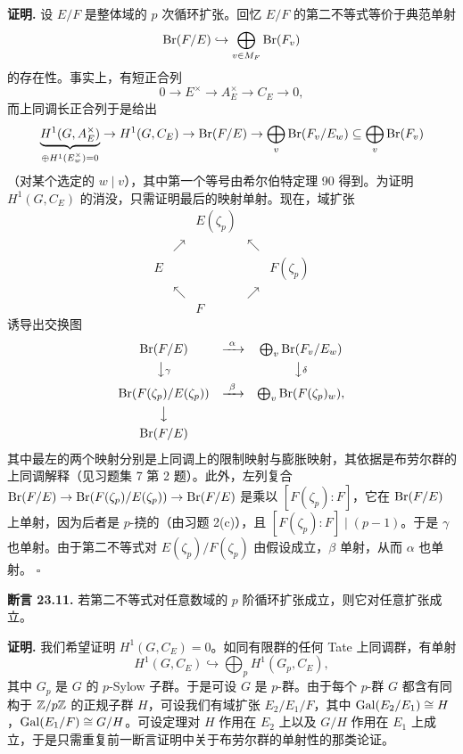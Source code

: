\textbf{证明.} 设 $E/F$ 是整体域的 $p$ 次循环扩张。回忆 $E/F$ 的第二不等式等价于典范单射
\[
\operatorname{Br}(F/E)\hookrightarrow\bigoplus_{v\in M_F}\operatorname{Br}(F_v)
\]
的存在性。事实上，有短正合列
\[
0\to E^\times\to A_E^\times\to C_E\to 0,
\]
而上同调长正合列于是给出
\[
\underbrace{H^1(G,A_E^\times)}_{\oplus H^1(E_w^\times)=0}\to H^1(G,C_E)\to\operatorname{Br}(F/E)\to\bigoplus_v\operatorname{Br}(F_v/E_w)\subseteq\bigoplus_v\operatorname{Br}(F_v)
\]
（对某个选定的 $w\mid v$），其中第一个等号由希尔伯特定理 90 得到。为证明 $H^1(G,C_E)$ 的消没，只需证明最后的映射单射。现在，域扩张
\[
\begin{array}{ccccc}
& & E(\zeta_p) & &\\
& \nearrow & & \nwarrow &\\
E & & & & F(\zeta_p)\\
& \nwarrow & & \nearrow &\\
& & F & &
\end{array}
\]
诱导出交换图
\[
\begin{array}{ccc}
\operatorname{Br}(F/E) & \xrightarrow{\ \alpha\ } & \bigoplus_v\operatorname{Br}(F_v/E_w)\\[4pt]
\big\downarrow{\scriptstyle\gamma} & & \big\downarrow{\scriptstyle\delta}\\[4pt]
\operatorname{Br}(F(\zeta_p)/E(\zeta_p)) & \xrightarrow{\ \beta\ } & \bigoplus_v\operatorname{Br}(F(\zeta_p)_w),\\[4pt]
\big\downarrow & & \\[4pt]
\operatorname{Br}(F/E) & &
\end{array}
\]
其中最左的两个映射分别是上同调上的限制映射与膨胀映射，其依据是布劳尔群的上同调解释（见习题集 7 第 2 题）。此外，左列复合 $\operatorname{Br}(F/E)\to\operatorname{Br}(F(\zeta_p)/E(\zeta_p))\to\operatorname{Br}(F/E)$ 是乘以 $[F(\zeta_p):F]$，它在 $\operatorname{Br}(F/E)$ 上单射，因为后者是 $p$-挠的（由习题 2(c)），且 $[F(\zeta_p):F]\mid(p-1)$。于是 $\gamma$ 也单射。由于第二不等式对 $E(\zeta_p)/F(\zeta_p)$ 由假设成立，$\beta$ 单射，从而 $\alpha$ 也单射。
\hfill$\square$

\textbf{断言 23.11.} 若第二不等式对任意数域的 $p$ 阶循环扩张成立，则它对任意扩张成立。

\textbf{证明.} 我们希望证明 $H^1(G,C_E)=0$。如同有限群的任何 Tate 上同调群，有单射
\[
H^1(G,C_E)\hookrightarrow\bigoplus_p H^1(G_p,C_E),
\]
其中 $G_p$ 是 $G$ 的 $p$-Sylow 子群。于是可设 $G$ 是 $p$-群。由于每个 $p$-群 $G$ 都含有同构于 $\mathbb{Z}/p\mathbb{Z}$ 的正规子群 $H$，可设我们有域扩张 $E_2/E_1/F$，其中 $\operatorname{Gal}(E_2/E_1)\cong H$，$\operatorname{Gal}(E_1/F)\cong G/H$。可设定理对 $H$ 作用在 $E_2$ 上以及 $G/H$ 作用在 $E_1$ 上成立，于是只需重复前一断言证明中关于布劳尔群的单射性的那类论证。

